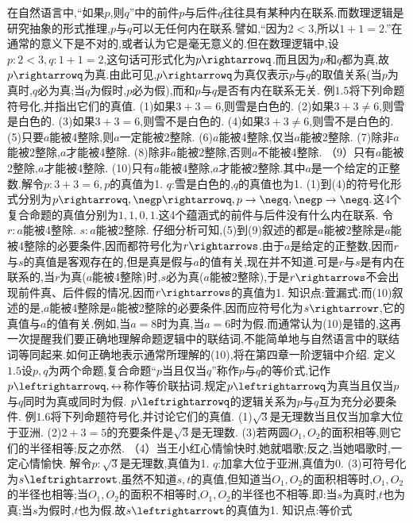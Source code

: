 {在自然语言中,“如果$p$,则$q$”中的前件$p$与后件$q$往往具有某种内在联系.而数理逻辑是研究抽象的形式推理,$p$与$q$可以无任何内在联系.譬如,“因为$2<3$,所以$1+1=2$.”在通常的意义下是不对的,或者认为它是毫无意义的.但在数理逻辑中,设$p:2<3,q:1+1=2$,这句话可形式化为$p\rightarrowq$.而且因为$p$和$q$都为真,故$p\rightarrowq$为真.由此可见,$p\rightarrowq$为真仅表示$p$与$q$的取值关系(当$p$为真时,$q$必为真;当$q$为假时,$p$必为假),而和$p$与$q$是否有内在联系无关.
例$1.5$将下列命题符号化,并指出它们的真值.
(1)如果$3+3=6$,则雪是白色的.
(2)如果$3+3\neq6$,则雪是白色的.
(3)如果$3+3=6$,则雪不是白色的.
(4)如果$3+3\neq6$,则雪不是白色的.
(5)只要$a$能被4整除,则$a$一定能被2整除.
(6)$a$能被4整除,仅当$a$能被2整除.
(7)除非$a$能被2整除,$a$才能被4整除.
(8)除非$a$能被2整除,否则$a$不能被4整除.
（9）只有$a$能被2整除,$a$才能被4整除.
(10)只有$a$能被4整除,$a$才能被2整除.其中$a$是一个给定的正整数.解令$p:3+3=6,p$的真值为1.
$q$:雪是白色的,$q$的真值也为1.
(1)到(4)的符号化形式分别为$p\rightarrowq,\negp\rightarrowq,p\rightarrow\negq,\negp\rightarrow\negq.$这4个复合命题的真值分别为$1,1,0,1$.这4个蕴涵式的前件与后件没有什么内在联系.
令$r:a$能被4整除.
$s:a$能被2整除.
仔细分析可知,(5)到(9)叙述的都是$a$能被2整除是$a$能被4整除的必要条件,因而都符号化为$r\rightarrows$.由于$a$是给定的正整数,因而$r$与$s$的真值是客观存在的,但是真是假与$a$的值有关,现在并不知道.可是$r$与$s$是有内在联系的,当$r$为真($a$能被4整除)时,$s$必为真($a$能被2整除),于是$r\rightarrows$不会出现前件真、后件假的情况,因而$r\rightarrows$的真值为1.
知识点:萓漏式:而(10)叙述的是,$a$能被4整除是$a$能被2整除的必要条件,因而应符号化为$s\rightarrowr$,它的真值与$a$的值有关.例如,当$a=8$时为真,当$a=6$时为假.而通常认为(10)是错的,这再一次提醒我们要正确地理解命题逻辑中的联结词,不能简单地与自然语言中的联结词等同起来.如何正确地表示通常所理解的(10),将在第四章一阶逻辑中介绍.
定义$1.5$设$p,q$为两个命题,复合命题“$p$当且仅当$q$”称作$p$与$q$的等价式,记作$p\leftrightarrowq,\leftrightarrow$称作等价联拈词.规定$p\leftrightarrowq$为真当且仅当$p$与$q$同时为真或同时为假.
$p\leftrightarrowq$的逻辑关系为$p$与$q$互为充分必要条件.
例$1.6$将下列命题符号化,并讨论它们的真值.
(1)$\sqrt{3}$是无理数当且仅当加拿大位于亚洲.
(2)$2+3=5$的充要条件是$\sqrt{3}$是无理数.
(3)若两圆$O_{1},O_{2}$的面积相等,则它们的半径相等;反之亦然.
（4）当王小红心情愉快时,她就唱歌;反之,当她唱歌时,一定心情愉快.
解令$p:\sqrt{3}$是无理数,真值为1.
$q$:加拿大位于亚洲,真值为0.
(3)可符号化为$s\leftrightarrowt$.虽然不知道$s,t$的真值,但知道当$O_{1},O_{2}$的面积相等时,$O_{1},O_{2}$的半径也相等;当$O_{1},O_{2}$的面积不相等时,$O_{1},O_{2}$的半径也不相等.即:当$s$为真时,$t$也为真;当$s$为假时,$t$也为假.故$s\leftrightarrowt$的真值为1.
知识点:等价式
}
